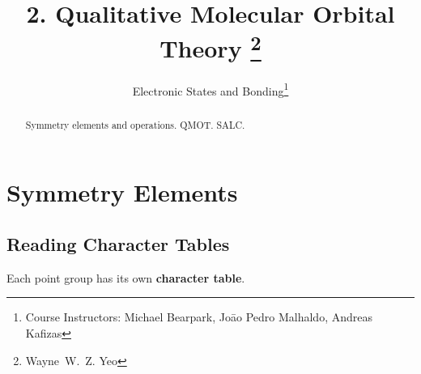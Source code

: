 \documentclass[a4paper]{tufte-handout}
\title{2. Qualitative Molecular Orbital Theory \thanks{Wayne~W.~Z. Yeo}}
\author[ESB]{Electronic States and Bonding\thanks{Course Instructors: Michael Bearpark, Joāo Pedro Malhaldo, Andreas Kafizas}}
\theoremstyle{definition}
\begin{document}
\maketitle%

\begin{abstract}
\noindent
Symmetry elements and operations. QMOT. SALC.
\end{abstract}



\section{Symmetry Elements}

\subsection{Reading Character Tables}
Each point group has its own \textbf{character table}.
\end{document}
